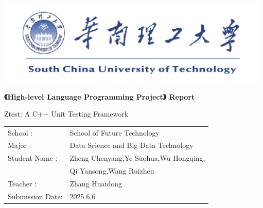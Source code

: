 \documentclass{article}
\begin{document}
\begin{titlepage}
    \centering
    \vspace*{1cm}

    \includegraphics[width=\textwidth]{img/logo.png} %

    \fontsize{24pt}{32pt}\selectfont
    \textbf{《High-level Language Programming Project》 Report}
    \vspace{4cm}

    \centering
    Ztest: A C++ Unit Testing Framework
    \vspace{2cm}

    \fontsize{16pt}{16pt}\selectfont
    \begin{tabular}{ll}                                                                \\
        School       :   & School of Future Technology\hspace{6cm}          \\
        Major        :   & Data Science and Big Data Technology\hspace{6cm} \\
        Student Name :   & Zheng Chenyang,Ye Suohua,Wu Hongqing,            \\
                         & Qi Yansong,Wang Ruizhen                          \\
        Teacher      :   & Zhang Huaidong\hspace{6cm}                       \\
        Submission Date: & 2025.6.6\hspace{6cm}                             \\
    \end{tabular}

    \vfill

    \vspace{1cm}
\end{titlepage}

\tableofcontents  %
\newpage
\end{document}

